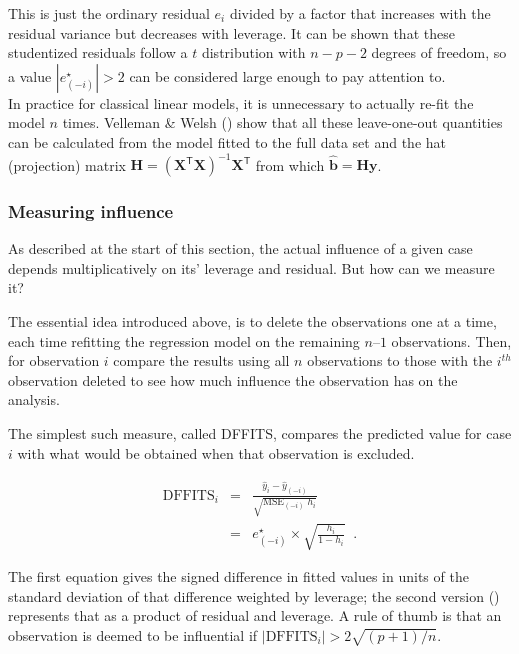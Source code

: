 \documentclass[
  letterpaper,
  10pt,
  krantz2]{krantz}
\begin{document}
{This is just the ordinary residual \(e_i\) divided by a factor that
increases with the residual variance but decreases with leverage. It can
be shown that these studentized residuals follow a \(t\) distribution
with \(n - p -2\) degrees of freedom, so a value
\(|e^\star_{(-i)}| > 2\) can be considered large enough to pay attention
to.\\
In practice for classical linear models, it is unnecessary to actually
re-fit the model \(n\) times. Velleman \& Welsh
() show that all these
leave-one-out quantities can be calculated from the model fitted to the
full data set and the hat (projection) matrix
\(\mathbf{H} = (\mathbf{X}^\mathsf{T}\mathbf{X})^{-1} \mathbf{X}^\mathsf{T}\)
from which \(\widehat{\mathbf{b}} = \mathbf{H} \mathbf{y}\).

\subsubsection{Measuring influence}\label{measuring-influence}

As described at the start of this section, the actual influence of a
given case depends multiplicatively on its' leverage and residual. But
how can we measure it?

The essential idea introduced above, is to delete the observations one
at a time, each time refitting the regression model on the remaining
\(n–1\) observations. Then, for observation \(i\) compare the results
using all \(n\) observations to those with the \(i^{th}\) observation
deleted to see how much influence the observation has on the analysis.

The simplest such measure, called DFFITS, compares the predicted value
for case \(i\) with what would be obtained when that observation is
excluded.

\begin{eqnarray*}
\text{DFFITS}_i & = & \frac{\hat{y}_i - \hat{y}_{(-i)}}{\sqrt{\text{MSE}_{(-i)}\; h_i}} \\
   & = & e^\star_{(-i)} \times \sqrt{\frac{h_i}{1-h_i}} \;\; .
\end{eqnarray*}

The first equation gives the signed difference in fitted values in units
of the standard deviation of that difference weighted by leverage; the
second version ()
represents that as a product of residual and leverage. A rule of thumb
is that an observation is deemed to be influential if
\(| \text{DFFITS}_i | > 2 \sqrt{(p+1) / n}\).

}
\end{document}
